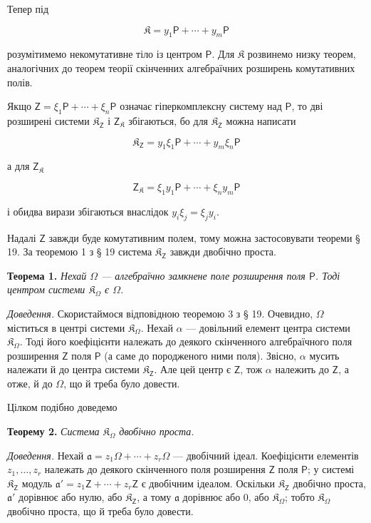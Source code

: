 \documentclass[11pt]{article}
\begin{document}
Тепер під

\[
\mathfrak K=y_1\mathsf P+\cdots+y_m\mathsf P
\]

розумітимемо некомутативне тіло із центром \(\mathsf P\). Для \(\mathfrak K\) розвинемо низку теорем, аналогічних до теорем теорії скінченних алгебраїчних розширень комутативних полів.

Якщо \(\mathsf{Z}=\xi_1\mathsf P+\cdots+\xi_n\mathsf P\) означає гіперкомплексну систему над \(\mathsf P\), то дві розширені системи \(\mathfrak K_{\mathsf{Z}}\) і \(\mathsf{Z}_{\mathfrak K}\) збігаються, бо для \(\mathfrak K_{\mathsf{Z}}\) можна написати

\[
\mathfrak K_{\mathsf{Z}}=y_1\xi_1\mathsf P+\cdots+y_m\xi_n\mathsf P
\]

а для \(\mathsf{Z}_{\mathfrak K}\)

\[
\mathsf{Z}_{\mathfrak K}=\xi_1y_1\mathsf P+\cdots+\xi_ny_m\mathsf P
\]

і обидва вирази збігаються внаслідок \(y_i\xi_j=\xi_jy_i\).

Надалі \(\mathsf{Z}\) завжди буде комутативним полем, тому можна застосовувати теореми § 19. За теоремою 1 з § 19 система \(\mathfrak K_{\mathsf{Z}}\) завжди двобічно проста.

\textbf{Теорема 1.} \emph{Нехай \(\Omega\) --- алгебраїчно замкнене поле розширення поля \(\mathsf P\). Тоді центром системи \(\mathfrak K_\Omega\) є \(\Omega\).}

\emph{Доведення.} Скористаймося відповідною теоремою 3 з § 19. Очевидно, \(\Omega\) міститься в центрі системи \(\mathfrak K_\Omega\). Нехай \(\alpha\) --- довільний елемент центра системи \(\mathfrak K_\Omega\). Тоді його коефіцієнти належать до деякого скінченного алгебраїчного поля розширення \(\mathsf{Z}\) поля \(\mathsf P\) (а саме до породженого ними поля). Звісно, \(\alpha\) мусить належати й до центра системи \(\mathfrak K_{\mathsf{Z}}\). Але цей центр є \(\mathsf{Z}\), тож \(\alpha\) належить до \(\mathsf{Z}\), а отже, й до \(\Omega\), що й треба було довести.

Цілком подібно доведемо

\textbf{Теорему 2.} \emph{Система \(\mathfrak K_\Omega\) двобічно проста.}

\emph{Доведення.} Нехай \(\mathfrak a=z_1\Omega+\cdots+z_r\Omega\) --- двобічний ідеал. Коефіцієнти елементів \(z_1,\ldots,z_r\) належать до деякого скінченного поля розширення \(\mathsf{Z}\) поля \(\mathsf P\); у системі \(\mathfrak K_{\mathsf{Z}}\) модуль \(\mathfrak a'=z_1\mathsf{Z}+\cdots+z_r\mathsf{Z}\) є двобічним ідеалом. Оскільки \(\mathfrak K_{\mathsf{Z}}\) двобічно проста, \(\mathfrak a'\) дорівнює або нулю, або \(\mathfrak K_{\mathsf{Z}}\), а тому \(\mathfrak a\) дорівнює або 0, або \(\mathfrak K_\Omega\); тобто \(\mathfrak K_\Omega\) двобічно проста, що й треба було довести.
\end{document}
